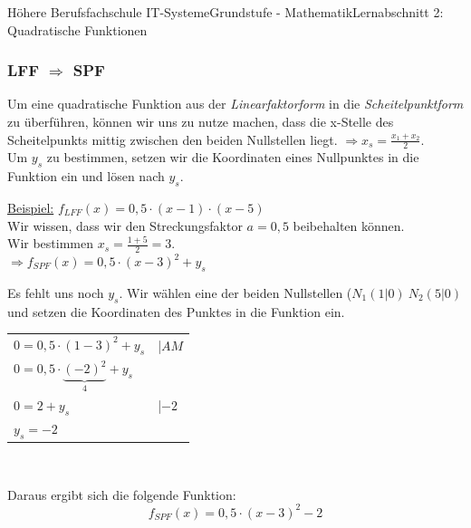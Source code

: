 \documentclass[11pt,twocolumn,oneside,openany,headings=optiontotoc,11pt,numbers=noenddot]{article}
\begin{document}
\begin{worksheet}{Höhere Berufsfachschule IT-Systeme}{Grundstufe - Mathematik}{Lernabschnitt 2: Quadratische Funktionen}
		\subsubsection*{LFF \(\Rightarrow\) SPF}
		Um eine quadratische Funktion aus der \textit{Linearfaktorform} in die \textit{Scheitelpunktform} zu überführen, können wir uns zu nutze machen, dass die x-Stelle des Scheitelpunkts mittig zwischen den beiden Nullstellen liegt. \(\Rightarrow x_s = \frac{x_1+x_2}{2}\).\\
		Um \(y_s\) zu bestimmen, setzen wir die Koordinaten eines Nullpunktes in die Funktion ein und lösen nach \(y_s\).\\
		\par\noindent
		\underline{Beispiel:} \(f_{LFF}(x) = 0,5\cdot(x-1)\cdot(x-5)\)\\
		Wir wissen, dass wir den Streckungsfaktor \(a = 0,5\) beibehalten können.\\
		Wir bestimmen \(x_s = \frac{1+5}{2} = 3\).\\
		\(\Rightarrow f_{SPF}(x) = 0,5\cdot(x-3)^2 + y_s\)\\
		\par\noindent
		Es fehlt uns noch \(y_s\). Wir wählen eine der beiden Nullstellen (\(N_1(1|0)\ N_2(5|0)\) und setzen die Koordinaten des Punktes in die Funktion ein.\\
		\par\noindent
		\begin{tabularx}{0.5\textwidth}{ll}
			\(0 = 0,5\cdot(1-3)^2 + y_s\) & |\(AM\)\\
			\(0 = 0,5\cdot\underbrace{(-2)^2}_{4} + y_s\)\\
			\(0 = 2 +y_s\) & |\(-2\)\\
			\(y_s = -2\)
		\end{tabularx}\\
		\par\noindent
		Daraus ergibt sich die folgende Funktion: \[f_{SPF}(x) = 0,5\cdot(x-3)^2-2\]

\end{worksheet}
\end{document}
